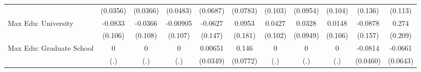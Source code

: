 {\begin{tabular}{l*{10}{c}}
            &    (0.0356)         &    (0.0366)         &    (0.0483)         &    (0.0687)         &    (0.0783)         &     (0.103)         &    (0.0954)         &     (0.104)         &     (0.136)         &     (0.113)         \\
\addlinespace
Max Edu: University&     -0.0833         &     -0.0366         &    -0.00905         &     -0.0627         &      0.0953         &      0.0427         &      0.0328         &      0.0148         &     -0.0878         &       0.274         \\
            &     (0.106)         &     (0.108)         &     (0.107)         &     (0.147)         &     (0.181)         &     (0.102)         &    (0.0949)         &     (0.106)         &     (0.157)         &     (0.209)         \\
\addlinespace
Max Edu: Graduate School&           0         &           0         &           0         &     0.00651         &       0.146         &           0         &           0         &           0         &     -0.0814         &     -0.0661         \\
            &         (.)         &         (.)         &         (.)         &    (0.0349)         &    (0.0772)         &         (.)         &         (.)         &         (.)         &    (0.0460)         &    (0.0643)         \\
\bottomrule
\end{tabular}
}
